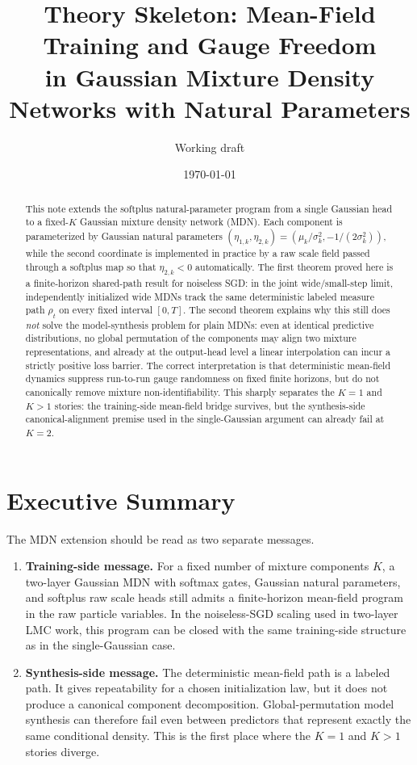 \documentclass[11pt]{article}
\title{Theory Skeleton: Mean-Field Training and Gauge Freedom\\in Gaussian Mixture Density Networks with Natural Parameters}
\author{Working draft}
\date{\today}
\theoremstyle{definition}
\begin{document}
\maketitle

\begin{abstract}
This note extends the softplus natural-parameter program from a single Gaussian
head to a fixed-$K$ Gaussian mixture density network (MDN). Each component is
parameterized by Gaussian natural parameters
$(\eta_{1,k},\eta_{2,k})=(\mu_k/\sigma_k^2,-1/(2\sigma_k^2))$, while the second
coordinate is implemented in practice by a raw scale field passed through a
softplus map so that $\eta_{2,k}<0$ automatically. The first theorem proved
here is a finite-horizon shared-path result for noiseless SGD: in the joint
wide/small-step limit, independently initialized wide MDNs track the same
deterministic labeled measure path $\rho_t$ on every fixed interval $[0,T]$.
The second theorem explains why this still does \emph{not} solve the
model-synthesis problem for plain MDNs: even at identical predictive
distributions, no global permutation of the components may align two mixture
representations, and already at the output-head level a linear interpolation can
incur a strictly positive loss barrier. The correct interpretation is that
deterministic mean-field dynamics suppress run-to-run gauge randomness on fixed
finite horizons, but do not canonically remove mixture non-identifiability.
This sharply separates the $K=1$ and $K>1$ stories: the training-side
mean-field bridge survives, but the synthesis-side canonical-alignment premise
used in the single-Gaussian argument can already fail at $K=2$.
\end{abstract}

\section{Executive Summary}

The MDN extension should be read as two separate messages.

\begin{enumerate}[label=(\roman*)]
  \item \textbf{Training-side message.} For a fixed number of mixture
  components $K$, a two-layer Gaussian MDN with softmax gates, Gaussian natural
  parameters, and softplus raw scale heads still admits a finite-horizon
  mean-field program in the raw particle variables. In the noiseless-SGD
  scaling used in two-layer LMC work, this program can be closed with the same
  training-side structure as in the single-Gaussian case.
  \item \textbf{Synthesis-side message.} The deterministic mean-field path is a
  labeled path. It gives repeatability for a chosen initialization law, but it
  does not produce a canonical component decomposition. Global-permutation model
  synthesis can therefore fail even between predictors that represent exactly
  the same conditional density. This is the first place where the $K=1$ and
  $K>1$ stories diverge.
\end{enumerate}
\end{document}

